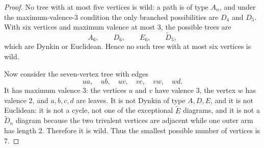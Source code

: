 \documentclass[11pt]{article}
\begin{document}
\begin{enumerate}[label=\arabic*., leftmargin=2em, itemsep=1.1em]
\begin{proof}
      No tree with at most five vertices is wild: a path is of type $A_n$, and under
      the maximum-valence-$3$ condition the only branched possibilities are $D_4$
      and $D_5$. With six vertices and maximum valence at most $3$, the possible
      trees are
      \[
        A_6,\qquad D_6,\qquad E_6,\qquad \widetilde D_5,
      \]
      which are Dynkin or Euclidean. Hence no such tree with at most six vertices
      is wild.

      Now consider the seven-vertex tree with edges
      \[
        ua,\quad ub,\quad uv,\quad vc,\quad vw,\quad wd.
      \]
      It has maximum valence $3$: the vertices $u$ and $v$ have valence $3$, the
      vertex $w$ has valence $2$, and $a,b,c,d$ are leaves. It is not Dynkin of
      type $A,D,E$, and it is not Euclidean: it is not a cycle, not one of the
      exceptional $\widetilde E$ diagrams, and it is not a $\widetilde D_n$ diagram
      because the two trivalent vertices are adjacent while one outer arm has length
      $2$. Therefore it is wild. Thus the smallest possible number of vertices is
      $7$.
    \end{proof}
\end{enumerate}
\end{document}

